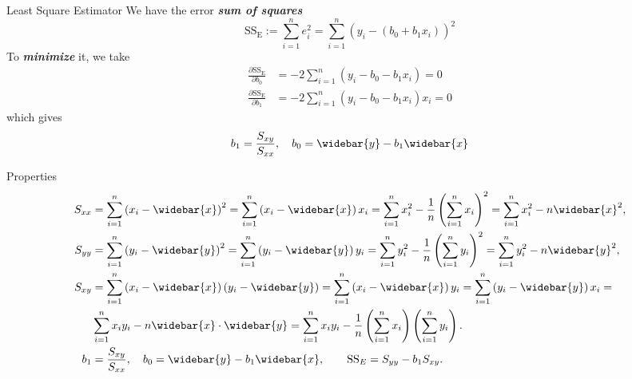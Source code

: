 \documentclass{beamer}
\newcommand{\bb}[1]{\textcolor{antiquefuchsia}{\textbf{\textit{#1}}}}
\begin{document}
\begin{frame}{Least Square Estimator}
We have the error \bb{sum of squares}
$$
\mathrm{SS}_{\mathrm{E}}:=\sum_{i=1}^{n} e_{i}^{2}=\sum_{i=1}^{n}\left(y_{i}-\left(b_{0}+b_{1} x_{i}\right)\right)^{2}
$$
To \bb{minimize} it, we take
$$
\begin{aligned}
\frac{\partial \mathrm{SS}_{\mathrm{E}}}{\partial b_{0}} &=-2 \sum_{i=1}^{n}\left(y_{i}-b_{0}-b_{1} x_{i}\right)=0 \\
\frac{\partial \mathrm{SS}_{\mathrm{E}}}{\partial b_{1}} &=-2 \sum_{i=1}^{n}\left(y_{i}-b_{0}-b_{1} x_{i}\right) x_{i}=0
\end{aligned}
$$
which gives
$$
b_{1}=\frac{S_{x y}}{S_{x x}}, \quad b_{0}=\widebar{y}-b_{1} \widebar{x}
$$
\end{frame}

\begin{frame}{Properties}
$$
\begin{aligned}
S_{x x} &=\sum_{i=1}^{n}\left(x_{i}-\widebar{x}\right)^{2}=\sum_{i=1}^{n}\left(x_{i}-\widebar{x}\right) x_{i}=\sum_{i=1}^{n} x_{i}^{2}-\frac{1}{n}\left(\sum_{i=1}^{n} x_{i}\right)^{2}=\sum_{i=1}^{n} x_{i}^{2}-n \widebar{x}^{2}, \\
S_{y y} &=\sum_{i=1}^{n}\left(y_{i}-\widebar{y}\right)^{2}=\sum_{i=1}^{n}\left(y_{i}-\widebar{y}\right) y_{i}=\sum_{i=1}^{n} y_{i}^{2}-\frac{1}{n}\left(\sum_{i=1}^{n} y_{i}\right)^{2}=\sum_{i=1}^{n} y_{i}^{2}-n \widebar{y}^{2}, \\
S_{x y} &=\sum_{i=1}^{n}\left(x_{i}-\widebar{x}\right)\left(y_{i}-\widebar{y}\right)=\sum_{i=1}^{n}\left(x_{i}-\widebar{x}\right) y_{i}=\sum_{i=1}^{n}\left(y_{i}-\widebar{y}\right) x_{i}=\\
&\sum_{i=1}^{n} x_{i} y_{i}-n \widebar{x} \cdot \widebar{y} 
=\sum_{i=1}^{n} x_{i} y_{i}-\frac{1}{n}\left(\sum_{i=1}^{n} x_{i}\right)\left(\sum_{i=1}^{n} y_{i}\right) . \\
b_{1} &=\frac{S_{x y}}{S_{x x}}, \quad b_{0}=\widebar{y}-b_{1} \widebar{x}, \quad \quad \mathrm{SS}_{E}=S_{y y}-b_{1} S_{x y} .
\end{aligned}
$$
\end{frame}
\end{document}
